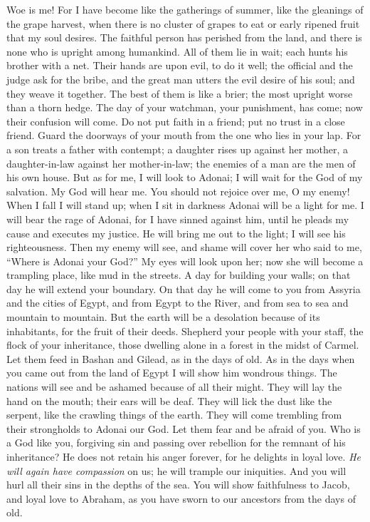 \begin{biblechapter} %
 Woe is me! For I have become 
like the gatherings of summer, 
like the gleanings of the grape harvest, 
when there is no cluster of grapes to eat 
or early ripened fruit that my soul desires.
\verse The faithful person has perished from the land, 
and there is none who is upright among humankind. 
All of them lie in wait; 
each hunts his brother with a net.
\verse Their hands are upon evil, to do it well; 
the official and the judge ask for the bribe, 
and the great man utters the evil desire of his soul; 
and they weave it together.
\verse The best of them is like a brier; 
the most upright worse than a thorn hedge. 
The day of your watchman, your punishment, has come; 
now their confusion will come.
\verse Do not put faith in a friend; 
put no trust in a close friend. 
Guard the doorways of your mouth 
from the one who lies in your lap.
\verse For a son treats a father with contempt; 
a daughter rises up against her mother, 
a daughter-in-law against her mother-in-law; 
the enemies of a man are the men of his own house.
\verse But as for me, I will look to Adonai; 
I will wait for the God of my salvation. 
My God will hear me.
\verse You should not rejoice over me, O my enemy! 
When I fall I will stand up; 
when I sit in darkness 
Adonai will be a light for me.
\verse I will bear the rage of Adonai, 
for I have sinned against him, 
until he pleads my cause 
and executes my justice. 
He will bring me out to the light; 
I will see his righteousness.
\verse Then my enemy will see, 
and shame will cover her who said to me, 
“Where is Adonai your God?” 
My eyes will look upon her; 
now she will become a trampling place, 
like mud in the streets.
\verse A day for building your walls; 
on that day he will extend your boundary.
\verse On that day he will come to you 
from Assyria and the cities of Egypt, 
and from Egypt to the River, 
and from sea to sea 
and mountain to mountain.
\verse But the earth will be a desolation 
because of its inhabitants, 
for the fruit of their deeds.
\verse Shepherd your people with your staff, 
the flock of your inheritance, 
those dwelling alone in a forest 
in the midst of Carmel. 
Let them feed in Bashan and Gilead, 
as in the days of old.
\verse As in the days when you came out 
from the land of Egypt 
I will show him wondrous things.
\verse The nations will see and be ashamed 
because of all their might. 
They will lay the hand on the mouth; 
their ears will be deaf.
\verse They will lick the dust like the serpent, 
like the crawling things of the earth. 
They will come trembling from their strongholds 
to Adonai our God. 
Let them fear and be afraid of you.
\verse Who is a God like you, forgiving sin 
and passing over rebellion for the remnant of his inheritance? 
He does not retain his anger forever, 
for he delights in loyal love.
\verse \textit{He will again have compassion} on us; 
he will trample our iniquities. 
And you will hurl all their sins 
in the depths of the sea.
\verse You will show faithfulness to Jacob, 
and loyal love to Abraham, 
as you have sworn to our ancestors 
from the days of old.
\end{biblechapter}

